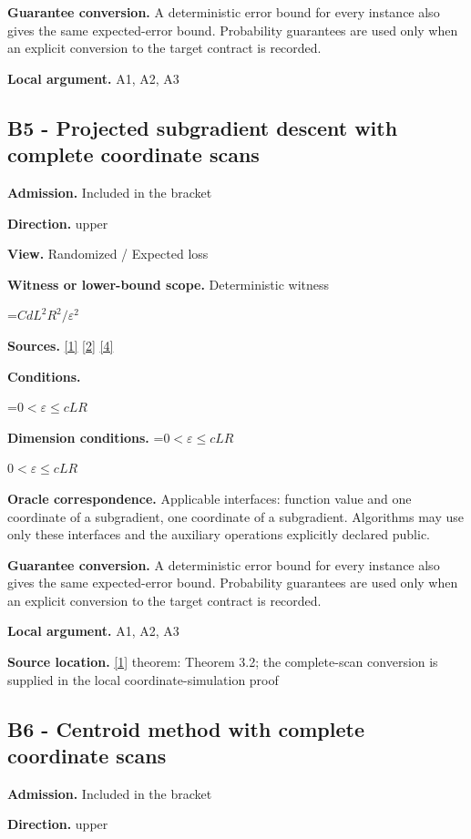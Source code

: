\documentclass[10pt,a4paper]{article}
\newcommand{\AtlasMath}[1]{\par\begingroup\centering\setbox0=\hbox{$\displaystyle #1$}\ifdim\wd0>1.4\linewidth\typeout{ATLAS WIDE FORMULA: \the\wd0}\fi\ifdim\wd0>\linewidth\resizebox{\linewidth}{!}{\box0}\else\box0\fi\par\endgroup}
\newcommand{\AtlasInlineMath}[1]{\begingroup\setbox0=\hbox{$#1$}\ifdim\wd0>.4\linewidth\endgroup\AtlasMath{#1}\else\endgroup$#1$\fi}
\begin{document}
\textbf{Guarantee conversion.} A deterministic error bound for every instance also gives the same expected-error bound. Probability guarantees are used only when an explicit conversion to the target contract is recorded.

\textbf{Local argument.} A1, A2, A3

\subsection{B5 - Projected subgradient descent with complete coordinate scans}
\textbf{Admission.} Included in the bracket

\textbf{Direction.} upper

\textbf{View.} Randomized / Expected loss

\textbf{Witness or lower-bound scope.} Deterministic witness

\AtlasMath{CdL^2R^2/\varepsilon^2}
\textbf{Sources.} \href{https://arxiv.org/pdf/1405.4980}{[1]} \href{https://www2.isye.gatech.edu/~nemirovs/MOR_AccuracyCertificates.pdf}{[2]} \href{https://arxiv.org/pdf/2609.20701}{[4]}

\textbf{Conditions.} 
\AtlasMath{0<\varepsilon\le cLR}


\textbf{Dimension conditions.} \AtlasInlineMath{0<\varepsilon\le cLR}

\textbf{Oracle correspondence.} Applicable interfaces: function value and one coordinate of a subgradient, one coordinate of a subgradient. Algorithms may use only these interfaces and the auxiliary operations explicitly declared public.

\textbf{Guarantee conversion.} A deterministic error bound for every instance also gives the same expected-error bound. Probability guarantees are used only when an explicit conversion to the target contract is recorded.

\textbf{Local argument.} A1, A2, A3

\textbf{Source location.} \href{https://arxiv.org/pdf/1405.4980}{[1]} theorem: Theorem 3.2; the complete-scan conversion is supplied in the local coordinate-simulation proof

\subsection{B6 - Centroid method with complete coordinate scans}
\textbf{Admission.} Included in the bracket

\textbf{Direction.} upper
\end{document}
